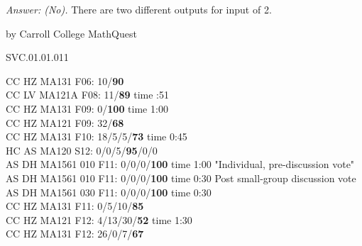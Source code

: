 {\it Answer: (No).} There are two different outputs for input of 2.




\medskip


by Carroll College MathQuest

SVC.01.01.011


CC HZ MA131 F06: 10/{\bf 90}\\
CC LV MA121A F08: 11/{\bf 89} time :51 \\
CC HZ MA131 F09: 0/{\bf100} time 1:00  \\
CC HZ MA121 F09: 32/{\bf68}  \\
CC HZ MA131 F10: 18/5/5/{\bf73} time 0:45  \\
HC AS MA120 S12: 0/0/5/{\bf95}/0/0  \\
AS DH MA1561 010 F11: 0/0/0/{\bf100} time 1:00 "Individual, pre-discussion vote" \\
AS DH MA1561 010 F11: 0/0/0/{\bf100} time 0:30 Post small-group discussion vote \\
AS DH MA1561 030 F11: 0/0/0/{\bf100} time 0:30  \\
CC HZ MA131 F11: 0/5/10/{\bf85}  \\
CC HZ MA121 F12: 4/13/30/{\bf52} time 1:30  \\
CC HZ MA131 F12: 26/0/7/{\bf67}  \\
